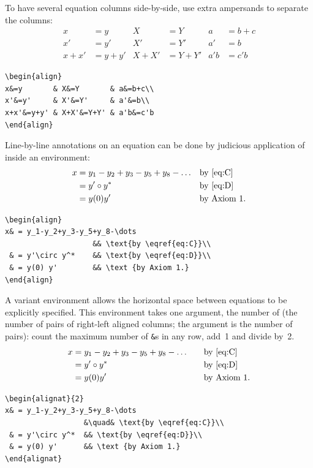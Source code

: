 \documentclass[leqno,titlepage,openany]{amsldoc}[1999/12/13]
\makeatletter
\let\oldcs\cs
\def\cs#1{\texorpdfstring{\oldcs{#1}}{\@backslashchar\@backslashchar#1}}
\let\cn\cs
\makeatother
\begin{document}
To have several equation columns side-by-side, use extra ampersands
to separate the columns:
\begin{align}
x&=y       & X&=Y       & a&=b+c\\
x'&=y'     & X'&=Y'     & a'&=b\\
x+x'&=y+y' & X+X'&=Y+Y' & a'b&=c'b
\end{align}
%
\begin{verbatim}
\begin{align}
x&=y       & X&=Y       & a&=b+c\\
x'&=y'     & X'&=Y'     & a'&=b\\
x+x'&=y+y' & X+X'&=Y+Y' & a'b&=c'b
\end{align}
\end{verbatim}
Line-by-line annotations on an equation can be done by judicious
application of \cn{text} inside an  environment:
\begin{align}
x& = y_1-y_2+y_3-y_5+y_8-\dots
                    && \text{by \eqref{eq:C}}\\
 & = y'\circ y^*    && \text{by \eqref{eq:D}}\\
 & = y(0) y'        && \text {by Axiom 1.}
\end{align}
%
\begin{verbatim}
\begin{align}
x& = y_1-y_2+y_3-y_5+y_8-\dots
                    && \text{by \eqref{eq:C}}\\
 & = y'\circ y^*    && \text{by \eqref{eq:D}}\\
 & = y(0) y'        && \text {by Axiom 1.}
\end{align}
\end{verbatim}
A variant environment  allows the horizontal space between
equations to be explicitly specified. This environment takes one argument,
the number of  (the number of pairs of right-left
aligned columns; the argument is the number of pairs): count the maximum
number of \verb'&'s in any row, add~1 and divide by~2.
\begin{alignat}{2}
x& = y_1-y_2+y_3-y_5+y_8-\dots
                  &\quad& \text{by \eqref{eq:C}}\\
 & = y'\circ y^*  && \text{by \eqref{eq:D}}\\
 & = y(0) y'      && \text {by Axiom 1.}
\end{alignat}
%
\begin{verbatim}
\begin{alignat}{2}
x& = y_1-y_2+y_3-y_5+y_8-\dots
                  &\quad& \text{by \eqref{eq:C}}\\
 & = y'\circ y^*  && \text{by \eqref{eq:D}}\\
 & = y(0) y'      && \text {by Axiom 1.}
\end{alignat}
\end{verbatim}
\end{document}
